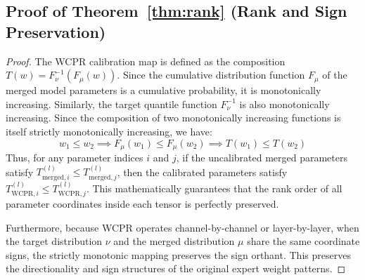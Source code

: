 \documentclass{article}
\theoremstyle{plain}
\theoremstyle{definition}
\theoremstyle{remark}
\begin{document}
\subsection{Proof of Theorem~\ref{thm:rank} (Rank and Sign Preservation)}
\label{app:proof_rank}
\begin{proof}
  The WCPR calibration map is defined as the composition $T(w) = F_{\nu}^{-1}(F_{\mu}(w))$. 
  Since the cumulative distribution function $F_{\mu}$ of the merged model parameters is a cumulative probability, it is monotonically increasing. Similarly, the target quantile function $F_{\nu}^{-1}$ is also monotonically increasing. Since the composition of two monotonically increasing functions is itself strictly monotonically increasing, we have:
  \begin{equation}
    w_1 \leq w_2 \implies F_{\mu}(w_1) \leq F_{\mu}(w_2) \implies T(w_1) \leq T(w_2)
  \end{equation}
  Thus, for any parameter indices $i$ and $j$, if the uncalibrated merged parameters satisfy $T^{(l)}_{\text{merged}, i} \leq T^{(l)}_{\text{merged}, j}$, then the calibrated parameters satisfy $T^{(l)}_{\text{WCPR}, i} \leq T^{(l)}_{\text{WCPR}, j}$. This mathematically guarantees that the rank order of all parameter coordinates inside each tensor is perfectly preserved.
  
  Furthermore, because WCPR operates channel-by-channel or layer-by-layer, when the target distribution $\nu$ and the merged distribution $\mu$ share the same coordinate signs, the strictly monotonic mapping preserves the sign orthant. This preserves the directionality and sign structures of the original expert weight patterns.
\end{proof}
\end{document}
